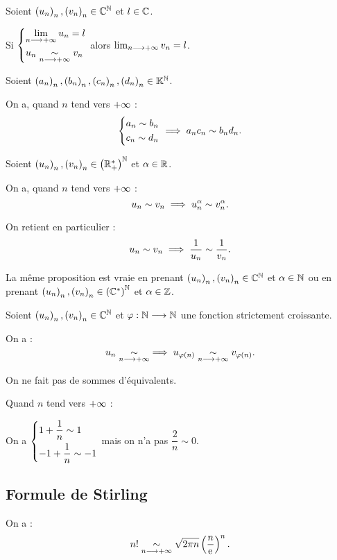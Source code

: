 \begin{prop}
Soient \(\left(u_n\right)_n,\left(v_n\right)_n\in\mathbb{C}^{\mathbb{N}}\) et \(l\in\mathbb{C}\).

Si \(\begin{dcases}
\lim_{n\longrightarrow+\infty}u_n=l \\
u_n\underset{n\longrightarrow+\infty}{\sim}v_n
\end{dcases}\) alors \(\lim_{n\longrightarrow+\infty}v_n=l\).
\end{prop}

\begin{prop}[Produits]
Soient \(\left(a_n\right)_n,\left(b_n\right)_n,\left(c_n\right)_n,\left(d_n\right)_n\in\mathbb{K}^{\mathbb{N}}\).

On a, quand \(n\) tend vers \(+\infty\) : \[\begin{dcases}
a_n\sim b_n \\
c_n\sim d_n
\end{dcases}\implies a_nc_n\sim b_nd_n.\]
\end{prop}

\begin{prop}[Puissances]
Soient \(\left(u_n\right)_n,\left(v_n\right)_n\in\left(\mathbb{R}_+^*\right)^{\mathbb{N}}\) et \(\alpha\in\mathbb{R}\).

On a, quand \(n\) tend vers \(+\infty\) : \[u_n\sim v_n\implies u_n^\alpha\sim v_n^\alpha.\]

On retient en particulier : \[u_n\sim v_n\implies\dfrac{1}{u_n}\sim\dfrac{1}{v_n}.\]

La même proposition est vraie en prenant \(\left(u_n\right)_n,\left(v_n\right)_n\in\mathbb{C}^{\mathbb{N}}\) et \(\alpha\in\mathbb{N}\) ou en prenant \(\left(u_n\right)_n,\left(v_n\right)_n\in\left(\mathbb{C}^*\right)^{\mathbb{N}}\) et \(\alpha\in\mathbb{Z}\).
\end{prop}

\begin{prop}
Soient \(\left(u_n\right)_n,\left(v_n\right)_n\in\mathbb{C}^{\mathbb{N}}\) et \(\varphi:\mathbb{N}\longrightarrow\mathbb{N}\) une fonction strictement croissante.

On a : \[u_n\underset{n\longrightarrow+\infty}{\sim}\implies u_{\varphi\left(n\right)}\underset{n\longrightarrow+\infty}{\sim}v_{\varphi\left(n\right)}.\]
\end{prop}

\begin{prop}[Sommes]
On ne fait pas de sommes d'équivalents.
\end{prop}

\begin{dem}
Quand \(n\) tend vers \(+\infty\) :

On a \(\begin{dcases}
1+\dfrac{1}{n}\sim1 \\
-1+\dfrac{1}{n}\sim-1
\end{dcases}\) mais on n'a pas \(\dfrac{2}{n}\sim0\).
\end{dem}

\subsection{Formule de Stirling}

\begin{theo}
On a : \[n!\underset{n\longrightarrow+\infty}{\sim}\sqrt{2\pi n}\left(\dfrac{n}{\mathrm{e}^{}}\right)^n.\]
\end{theo}

\begin{dem}
\end{dem}